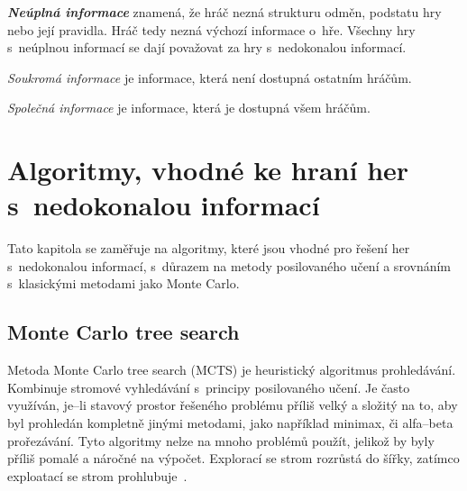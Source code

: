 \textbf{\emph{Neúplná informace}} znamená, že hráč nezná strukturu odměn, podstatu hry nebo její pravidla.
Hráč tedy nezná výchozí informace o~hře.
Všechny hry s~neúplnou informací se dají považovat za hry s~nedokonalou informací.
\bigskip

\emph{Soukromá informace} je informace, která není dostupná ostatním hráčům.

\emph{Společná informace} je informace, která je dostupná všem hráčům.

\chapter{Algoritmy, vhodné ke hraní her s~nedokonalou informací}\label{sec:vhodne-algoritmy-k-reseni-her-s-nedokonalou-informaci}

Tato kapitola se zaměřuje na algoritmy, které jsou vhodné pro řešení her s~nedokonalou informací, s~důrazem na metody posilovaného učení a srovnáním s~klasickými metodami jako Monte Carlo.

\section{Monte Carlo tree search}\label{subsec:monte-carlo-tree-search}
Metoda Monte Carlo tree search (MCTS) je heuristický algoritmus prohledávání.
Kombinuje stromové vyhledávání s~principy posilovaného učení.
Je často využíván, je--li stavový prostor řešeného problému příliš velký a složitý na to, aby byl prohledán kompletně jinými metodami, jako například minimax, či alfa--beta prořezávání.
Tyto  algoritmy nelze na mnoho problémů použít, jelikož by byly příliš pomalé a náročné na výpočet.
Explorací se strom rozrůstá do šířky, zatímco exploatací se strom prohlubuje~\cite{mcts_geeksforgeeks}.


